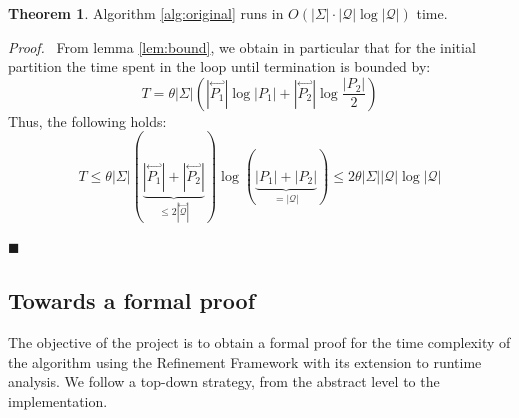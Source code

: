 \documentclass[12pt, a4 paper]{article}
\renewenvironment{proof}[1][Proof]{\begin{mdframed}[backgroundcolor=black!5, topline=false, rightline=false, bottomline=false, linecolor=black!15, linewidth=3pt]{\noindent\textit{#1.}\ }}{\noindent\par\hfill$\blacksquare$\end{mdframed}}
\theoremstyle{definition}
\newtheorem{theorem}{Theorem}
\begin{document}
\begin{theorem}
    \label{thm:complexity}
    Algorithm \ref{alg:original} runs in $O\left(|\Sigma|\cdot|\mathcal{Q}| \log |\mathcal{Q}|\right)$ time.
\end{theorem}
\begin{proof}
From lemma \ref{lem:bound}, we obtain in particular that for the initial partition the time spent in the loop until termination is bounded by:
$$T = \theta |\Sigma| \left(| \overset{\hookleftarrow}{P_1} | \log | P_1 | + | \overset{\hookleftarrow}{P_2} | \log \frac{| P_2 |}{2}\right)$$
Thus, the following holds:
$$T \leq \theta |\Sigma| (\underset{\leq 2|\overset{\hookleftarrow}{\mathcal{Q}}|}{\underbrace{|\overset{\hookleftarrow}{P_1}| + |\overset{\hookleftarrow}{P_2}|}})\log(\underset{= |\mathcal{Q}|}{\underbrace{|P_1| + |P_2|}}) \leq 2 \theta|\Sigma||\mathcal{Q}| \log |\mathcal{Q}|$$
\end{proof}

\subsection{Towards a formal proof}
The objective of the project is to obtain a formal proof for the time complexity of the algorithm using the Refinement Framework with its extension to runtime analysis. We follow a top-down strategy, from the abstract level to the implementation.
\end{document}
